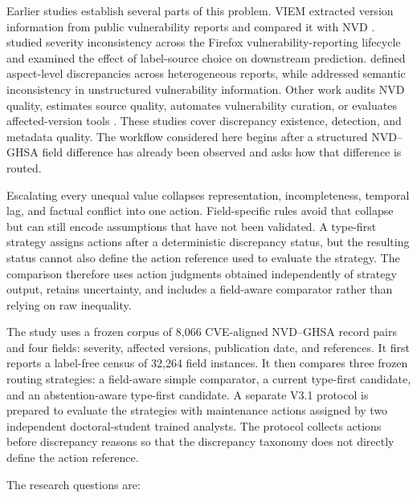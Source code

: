 \documentclass[preprint,review,12pt,authoryear]{elsarticle}
\begin{document}
Earlier studies establish several parts of this problem. VIEM extracted version
information from public vulnerability reports and compared it with NVD
\citep{Dong2019VIEM}. \citet{Croft2022Severity} studied severity inconsistency
across the Firefox vulnerability-reporting lifecycle and examined the effect of
label-source choice on downstream prediction. \citet{Sun2023Aspect} defined
aspect-level discrepancies across heterogeneous reports, while
\citet{Li2025VuldiffFinder} addressed semantic inconsistency in unstructured
vulnerability information. Other work audits NVD quality, estimates source
quality, automates vulnerability curation, or evaluates affected-version tools
\citep{Anwar2022CleaningNVD,Johnson2018CVSS,Okutan2023Curation,Chen2025AffectedVersions}.
These studies cover discrepancy existence, detection, and metadata quality.
The workflow considered here begins after a structured NVD--GHSA field
difference has already been observed and asks how that difference is routed.

Escalating every unequal value collapses representation, incompleteness,
temporal lag, and factual conflict into one action. Field-specific rules avoid
that collapse but can still encode assumptions that have not been validated.
A type-first strategy assigns actions after a deterministic discrepancy status,
but the resulting status cannot also define the action reference used to
evaluate the strategy. The comparison therefore uses action judgments obtained
independently of strategy output, retains uncertainty, and includes a
field-aware comparator rather than relying on raw inequality.

The study uses a frozen corpus of 8,066 CVE-aligned NVD--GHSA record pairs and
four fields: severity, affected versions, publication date, and references. It
first reports a label-free census of 32,264 field instances. It then compares
three frozen routing strategies: a field-aware simple comparator, a current
type-first candidate, and an abstention-aware type-first candidate. A separate
V3.1 protocol is prepared to evaluate the strategies with maintenance actions
assigned by two independent doctoral-student trained analysts. The protocol
collects actions before discrepancy reasons so that the discrepancy taxonomy
does not directly define the action reference.

The research questions are:
\end{document}
